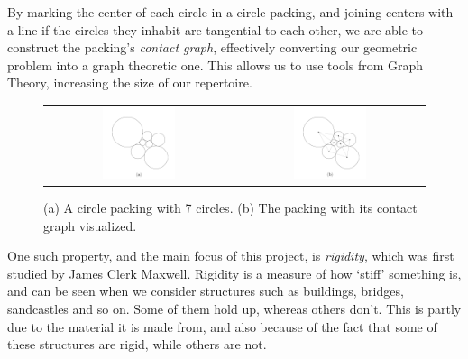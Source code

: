 \begin{flushleft}
By marking the center of each circle in a circle packing, and joining centers with a line if the circles they inhabit are tangential to each other, we are able to construct the packing's \textit{contact graph}, effectively converting our geometric problem into a graph theoretic one. This allows us to use tools from Graph Theory, increasing the size of our repertoire.    
\end{flushleft}

\begin{figure}[htbp]
    \centering
    \begin{tabular}{c c}
        \includegraphics[width = 0.4\textwidth]{Chapter 1/packing.png} & \includegraphics[width = 0.4\textwidth]{Chapter 1/packing_contact.png}   
    \end{tabular}
    \caption{(a) A circle packing with 7 circles. (b) The packing with its contact graph visualized.}
\end{figure}
\vspace{-2 mm}
\begin{flushleft}
One such property, and the main focus of this project, is \textit{rigidity}, which was first studied by James Clerk Maxwell. Rigidity is a measure of how `stiff' something is, and can be seen when we consider structures such as buildings, bridges, sandcastles and so on. Some of them hold up, whereas others don't. This is partly due to the material it is made from, and also because of the fact that some of these structures are rigid, while others are not.     
\end{flushleft}


